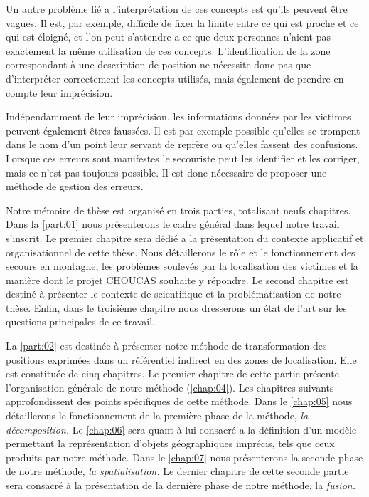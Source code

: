 Un autre problème lié a l'interprétation de ces concepts est qu'ils
peuvent être vagues.  Il est, par exemple, difficile de fixer la
limite entre ce qui est proche et ce qui est éloigné, et l'on peut
s'attendre a ce que deux personnes n'aient pas exactement la même
utilisation de ces concepts. L’identification de la zone correspondant
à une description de position ne nécessite donc pas que d'interpréter
correctement les concepts utilisés, mais également de prendre en
compte leur imprécision.

Indépendamment de leur imprécision, les informations données par les
victimes peuvent également êtres faussées. Il est par exemple possible
qu'elles se trompent dans le nom d'un point leur servant de reprère ou
qu'elles fassent des confusions. Lorsque ces erreurs sont manifestes
le secouriste peut les identifier et les corriger, mais ce n'est pas
toujours possible. Il est donc nécessaire de proposer une méthode de
gestion des erreurs.



Notre mémoire de thèse est organisé en trois parties, totalisant neufs
chapitres. Dans la \autoref{part:01} nous présenterons le cadre
général dans lequel notre travail s'inscrit. Le premier chapitre sera
dédié a la présentation du contexte applicatif et organisationnel de
cette thèse. Nous détaillerons le rôle et le fonctionnement des
secours en montagne, les problèmes soulevés par la localisation des
victimes et la manière dont le projet CHOUCAS souhaite y répondre. Le
second chapitre est destiné à présenter le contexte de scientifique et
la problématisation de notre thèse. Enfin, dans le troisième chapitre
nous dresserons un état de l'art sur les questions principales de ce
travail.

La \autoref{part:02} est destinée à présenter notre méthode de
transformation des positions exprimées dans un référentiel indirect en
des zones de localisation. Elle est constituée de cinq chapitres. Le
premier chapitre de cette partie présente l’organisation générale de
notre méthode (\autoref{chap:04}). Les chapitres suivants
approfondissent des points spécifiques de cette méthode. Dans le
\autoref{chap:05} nous détaillerons le fonctionnement de la première
phase de la méthode, \emph{la décomposition.} Le \autoref{chap:06}
sera quant à lui consacré a la définition d'un modèle permettant la
représentation d'objets géographiques imprécis, tels que ceux produits
par notre méthode. Dans le \autoref{chap:07} nous présenterons la
seconde phase de notre méthode, \emph{la spatialisation.} Le dernier
chapitre de cette seconde partie sera consacré à la présentation de la
dernière phase de notre méthode, la \emph{fusion.}

